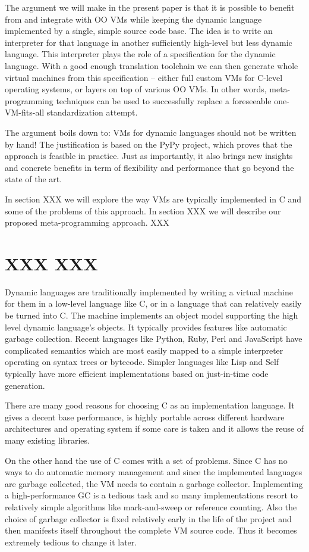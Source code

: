 \documentclass{llncs}
\begin{document}
The argument we will make in the present paper is that it is possible to
benefit from and integrate with OO VMs while keeping the dynamic
language implemented by a single, simple source code base.  The idea is
to write an interpreter for that language in another sufficiently
high-level but less dynamic language.  This interpreter plays the role
of a specification for the dynamic language.  With a good enough
translation toolchain we can then generate whole virtual machines from
this specification – either full custom VMs for C-level operating
systems, or layers on top of various OO VMs.  In other words,
meta-programming techniques can be used to successfully replace a
foreseeable one-VM-fits-all standardization attempt.

The argument boils down to: VMs for dynamic languages should not be
written by hand!  The justification is based on the
PyPy project, which proves that the approach is
feasible in practice.  Just as importantly, it also brings new insights
and concrete benefits in term of flexibility and performance that go
beyond the state of the art.

In section XXX we will explore the way VMs are typically implemented
in C and some of the problems of this approach. In section XXX we will describe
our proposed meta-programming approach. XXX


\section{XXX XXX}

Dynamic languages are traditionally implemented by writing a virtual
machine for them in a low-level language like C, or in a language that
can relatively easily be turned into C.  The machine implements an
object model supporting the high level dynamic language's objects.  It
typically provides features like automatic garbage collection.  Recent
languages like Python, Ruby, Perl and JavaScript have complicated
semantics which are most easily mapped to a simple interpreter operating
on syntax trees or bytecode. Simpler languages like Lisp and Self
typically have more efficient implementations based on just-in-time code
generation.

There are many good reasons for choosing C as an implementation language. It
gives a decent base performance, is highly portable across different hardware
architectures and operating system if some care is taken and it allows the reuse
of many existing libraries.

On the other hand the use of C comes with a set of problems. Since C has no ways
to do automatic memory management and since the implemented languages are
garbage collected, the VM needs to contain a garbage collector. Implementing a
high-performance GC is a tedious task and so many implementations resort to
relatively simple algorithms like mark-and-sweep or reference counting. Also the
choice of garbage collector is fixed relatively early in the life of the project
and then manifests itself throughout the complete VM source code. Thus it
becomes extremely tedious to change it later.
\end{document}
